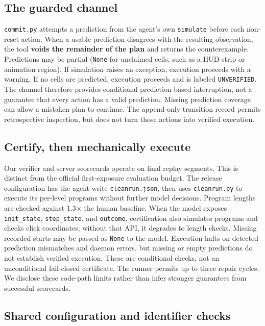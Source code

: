 \documentclass[11pt]{article}
\begin{document}
\subsection{The guarded channel}\label{sec:channel}

\texttt{commit.py} attempts a prediction from the agent's own \texttt{simulate} before each non-reset action. When a usable prediction disagrees with the resulting observation, the tool \textbf{voids the remainder of the plan} and returns the counterexample. Predictions may be partial (\texttt{None} for unclaimed cells, such as a HUD strip or animation region). If simulation raises an exception, execution proceeds with a warning. If no cells are predicted, execution proceeds and is labeled \texttt{UNVERIFIED}. The channel therefore provides conditional prediction-based interruption, not a guarantee that every action has a valid prediction. Missing prediction coverage can allow a mistaken plan to continue. The append-only transition record permits retrospective inspection, but does not turn those actions into verified execution.

\subsection{Certify, then mechanically execute}\label{sec:certifyreplay}

Our verifier and server scorecards operate on final replay segments. This is distinct from the official first-exposure evaluation budget. The release configuration has the agent write \texttt{cleanrun.json}, then uses \texttt{cleanrun.py} to execute its per-level programs without further model decisions. Program lengths are checked against 1.3$\times$ the human baseline. When the model exposes \texttt{init\_state}, \texttt{step\_state}, and \texttt{outcome}, certification also simulates programs and checks click coordinates; without that API, it degrades to length checks. Missing recorded starts may be passed as \texttt{None} to the model. Execution halts on detected prediction mismatches and daemon errors, but missing or empty predictions do not establish verified execution. These are conditional checks, not an unconditional fail-closed certificate. The runner permits up to three repair cycles. We disclose these code-path limits rather than infer stronger guarantees from successful scorecards.

\subsection{Shared configuration and identifier checks}\label{sec:agnostic}
\end{document}
